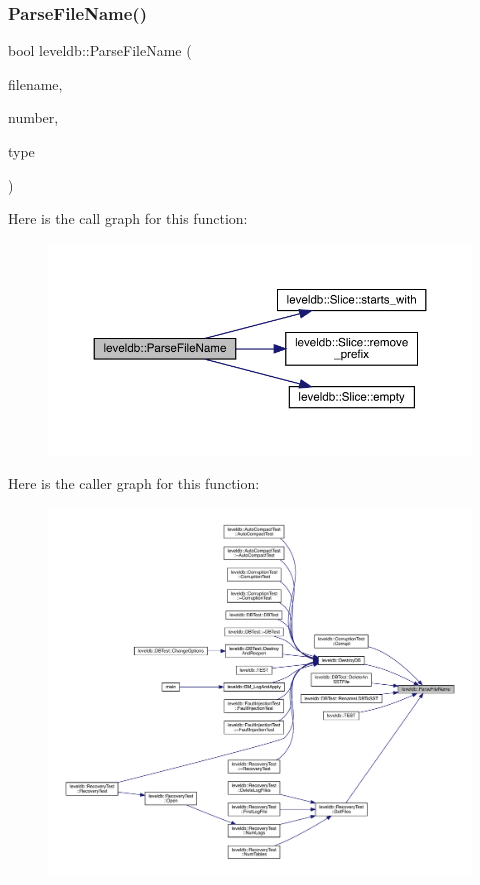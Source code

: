 \subsubsection{\texorpdfstring{ParseFileName()}{ParseFileName()}}
{\footnotesize\ttfamily bool leveldb\+::\+Parse\+File\+Name (\begin{DoxyParamCaption}\item[{const std\+::string \&}]{filename,  }\item[{uint64\+\_\+t $\ast$}]{number,  }\item[{\mbox{\hyperlink{namespaceleveldb_ab8e559ac5cadcb2b5dd531c60df944f1}{File\+Type}} $\ast$}]{type }\end{DoxyParamCaption})}

Here is the call graph for this function\+:
\nopagebreak
\begin{figure}[H]
\begin{center}
\leavevmode
\includegraphics[width=350pt]{namespaceleveldb_aa6901bbe2ff664657a6d4e01ba7d6d39_cgraph}
\end{center}
\end{figure}
Here is the caller graph for this function\+:
\nopagebreak
\begin{figure}[H]
\begin{center}
\leavevmode
\includegraphics[width=350pt]{namespaceleveldb_aa6901bbe2ff664657a6d4e01ba7d6d39_icgraph}
\end{center}
\end{figure}
\mbox{\label{namespaceleveldb_a5a173b622e86c7a2f9beae3ac8818ac3}} 
